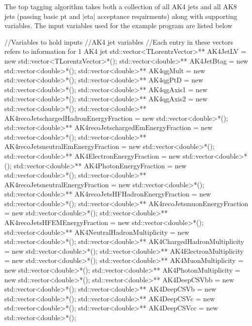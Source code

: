 The top tagging algorithm takes both a collection of all A\-K4 jets and all A\-K8 jets (passing basic pt and $\vert$eta$\vert$ acceptance requirments) along with supporting variables. The input variables used for the example program are listed below


\begin{DoxyCode}
\textcolor{comment}{//Variables to hold inputs}
\textcolor{comment}{//AK4 jet variables}
\textcolor{comment}{//Each entry in these vectors refers to information for 1 AK4 jet}
std::vector<TLorentzVector>** AK4JetLV = \textcolor{keyword}{new} std::vector<TLorentzVector>*();
std::vector<double>** AK4JetBtag = \textcolor{keyword}{new} std::vector<double>*();
std::vector<double>** AK4qgMult = \textcolor{keyword}{new} std::vector<double>*();
std::vector<double>** AK4qgPtD = \textcolor{keyword}{new} std::vector<double>*();
std::vector<double>** AK4qgAxis1 = \textcolor{keyword}{new} std::vector<double>*();
std::vector<double>** AK4qgAxis2 = \textcolor{keyword}{new} std::vector<double>*();
std::vector<double>** AK4recoJetschargedHadronEnergyFraction = \textcolor{keyword}{new} std::vector<double>*();
std::vector<double>** AK4recoJetschargedEmEnergyFraction = \textcolor{keyword}{new} std::vector<double>*();
std::vector<double>** AK4recoJetsneutralEmEnergyFraction = \textcolor{keyword}{new} std::vector<double>*();
std::vector<double>** AK4ElectronEnergyFraction = \textcolor{keyword}{new} std::vector<double>*();
std::vector<double>** AK4PhotonEnergyFraction = \textcolor{keyword}{new} std::vector<double>*();
std::vector<double>** AK4recoJetsneutralEnergyFraction = \textcolor{keyword}{new} std::vector<double>*();
std::vector<double>** AK4recoJetsHFHadronEnergyFraction = \textcolor{keyword}{new} std::vector<double>*();
std::vector<double>** AK4recoJetsmuonEnergyFraction = \textcolor{keyword}{new} std::vector<double>*();
std::vector<double>** AK4recoJetsHFEMEnergyFraction = \textcolor{keyword}{new} std::vector<double>*();
std::vector<double>** AK4NeutralHadronMultiplicity = \textcolor{keyword}{new} std::vector<double>*();
std::vector<double>** AK4ChargedHadronMultiplicity = \textcolor{keyword}{new} std::vector<double>*();
std::vector<double>** AK4ElectronMultiplicity = \textcolor{keyword}{new} std::vector<double>*();
std::vector<double>** AK4MuonMultiplicity = \textcolor{keyword}{new} std::vector<double>*();
std::vector<double>** AK4PhotonMultiplicity = \textcolor{keyword}{new} std::vector<double>*();
std::vector<double>** AK4DeepCSVbb = \textcolor{keyword}{new} std::vector<double>*();
std::vector<double>** AK4DeepCSVb = \textcolor{keyword}{new} std::vector<double>*();
std::vector<double>** AK4DeepCSVc = \textcolor{keyword}{new} std::vector<double>*();
std::vector<double>** AK4DeepCSVcc = \textcolor{keyword}{new} std::vector<double>*();


\end{DoxyCode}
